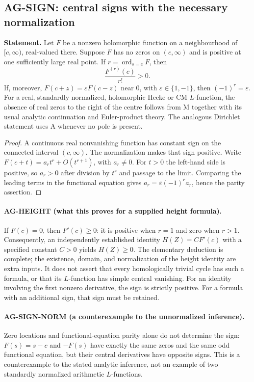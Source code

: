 \subsection{AG-SIGN: central signs with the necessary normalization}
\label{ag:sign}

\textbf{Statement.} Let $F$ be a nonzero holomorphic function on a
neighbourhood of $[c,\infty)$, real-valued there. Suppose $F$ has no zeros
on $(c,\infty)$ and is positive at one sufficiently large real point.
If $r=\operatorname{ord}_{s=c}F$, then
\[
 \frac{F^{(r)}(c)}{r!}>0.
\]
If, moreover, $F(c+z)=\varepsilon F(c-z)$ near $0$, with
$\varepsilon\in\{1,-1\}$, then $(-1)^r=\varepsilon$.
For a real, standardly normalized, holomorphic Hecke or CM $L$-function,
the absence of real zeros to the right of the centre follows from M
together with its usual analytic continuation and Euler-product theory.
The analogous Dirichlet statement uses A whenever no pole is present.

\begin{proof}
A continuous real nonvanishing function has constant sign on the connected
interval $(c,\infty)$. The normalization makes that sign positive.
Write $F(c+t)=a_rt^r+O(t^{r+1})$, with $a_r\ne0$. For $t>0$ the
left-hand side is positive, so $a_r>0$ after division by $t^r$ and passage
to the limit. Comparing the leading terms in the functional equation gives
$a_r=\varepsilon(-1)^r a_r$, hence the parity assertion.
\end{proof}

\paragraph{AG-HEIGHT (what this proves for a supplied height formula).}
If $F(c)=0$, then $F'(c)\ge0$: it is positive when $r=1$ and zero when
$r>1$. Consequently, an independently established identity
$H(Z)=C F'(c)$ with a specified constant $C>0$ yields $H(Z)\ge0$.
The elementary deduction is complete; the existence, domain, and
normalization of the height identity are extra inputs. It does not assert
that every homologically trivial cycle has such a formula, or that its
$L$-function has simple central vanishing. For an identity involving the
first nonzero derivative, the sign is strictly positive. For a formula with
an additional sign, that sign must be retained.

\paragraph{AG-SIGN-NORM (a counterexample to the unnormalized inference).}
Zero locations and functional-equation parity alone do not determine the
sign: $F(s)=s-c$ and $-F(s)$ have exactly the same zeros and the same odd
functional equation, but their central derivatives have opposite signs.
This is a counterexample to the stated analytic inference, not an example
of two standardly normalized arithmetic $L$-functions.

